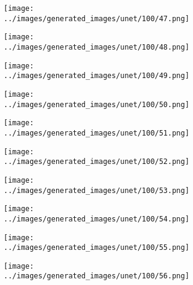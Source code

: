\begin{figure}[H]
\begin{subfigure}[b]{0.1\textwidth}
\centering
\texttt{[image: ../images/generated\_images/unet/100/47.png]}
\end{subfigure}
\hspace{1em}%
\begin{subfigure}[b]{0.1\textwidth}
\centering
\texttt{[image: ../images/generated\_images/unet/100/48.png]}
\end{subfigure}
\hspace{1em}%
\begin{subfigure}[b]{0.1\textwidth}
\centering
\texttt{[image: ../images/generated\_images/unet/100/49.png]}
\end{subfigure}
\hspace{1em}%
\begin{subfigure}[b]{0.1\textwidth}
\centering
\texttt{[image: ../images/generated\_images/unet/100/50.png]}
\end{subfigure}
\hspace{1em}%
\begin{subfigure}[b]{0.1\textwidth}
\centering
\texttt{[image: ../images/generated\_images/unet/100/51.png]}
\end{subfigure}
\hspace{1em}%
\begin{subfigure}[b]{0.1\textwidth}
\centering
\texttt{[image: ../images/generated\_images/unet/100/52.png]}
\end{subfigure}
\hspace{1em}%
\begin{subfigure}[b]{0.1\textwidth}
\centering
\texttt{[image: ../images/generated\_images/unet/100/53.png]}
\end{subfigure}
\hspace{1em}%
\begin{subfigure}[b]{0.1\textwidth}
\centering
\texttt{[image: ../images/generated\_images/unet/100/54.png]}
\end{subfigure}
\hspace{1em}%
\begin{subfigure}[b]{0.1\textwidth}
\centering
\texttt{[image: ../images/generated\_images/unet/100/55.png]}
\end{subfigure}
\hspace{1em}%
\begin{subfigure}[b]{0.1\textwidth}
\centering
\texttt{[image: ../images/generated\_images/unet/100/56.png]}
\end{subfigure}

\end{figure}
